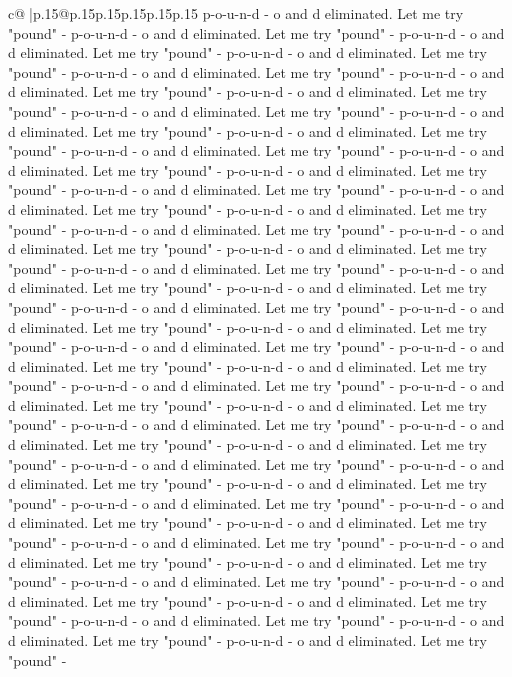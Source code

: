 \documentclass{article}
\begin{document}
{\begin{supertabular}{c@{$\;$}|p{.15\linewidth}@{}p{.15\linewidth}p{.15\linewidth}p{.15\linewidth}p{.15\linewidth}p{.15\linewidth}}
{{{p{-}o{-}u{-}n{-}d {-} o and d eliminated. Let me try "pound" {-} p{-}o{-}u{-}n{-}d {-} o and d eliminated. Let me try "pound" {-} p{-}o{-}u{-}n{-}d {-} o and d eliminated. Let me try "pound" {-} p{-}o{-}u{-}n{-}d {-} o and d eliminated. Let me try "pound" {-} p{-}o{-}u{-}n{-}d {-} o and d eliminated. Let me try "pound" {-} p{-}o{-}u{-}n{-}d {-} o and d eliminated. Let me try "pound" {-} p{-}o{-}u{-}n{-}d {-} o and d eliminated. Let me try "pound" {-} p{-}o{-}u{-}n{-}d {-} o and d eliminated. Let me try "pound" {-} p{-}o{-}u{-}n{-}d {-} o and d eliminated. Let me try "pound" {-} p{-}o{-}u{-}n{-}d {-} o and d eliminated. Let me try "pound" {-} p{-}o{-}u{-}n{-}d {-} o and d eliminated. Let me try "pound" {-} p{-}o{-}u{-}n{-}d {-} o and d eliminated. Let me try "pound" {-} p{-}o{-}u{-}n{-}d {-} o and d eliminated. Let me try "pound" {-} p{-}o{-}u{-}n{-}d {-} o and d eliminated. Let me try "pound" {-} p{-}o{-}u{-}n{-}d {-} o and d eliminated. Let me try "pound" {-} p{-}o{-}u{-}n{-}d {-} o and d eliminated. Let me try "pound" {-} p{-}o{-}u{-}n{-}d {-} o and d eliminated. Let me try "pound" {-} p{-}o{-}u{-}n{-}d {-} o and d eliminated. Let me try "pound" {-} p{-}o{-}u{-}n{-}d {-} o and d eliminated. Let me try "pound" {-} p{-}o{-}u{-}n{-}d {-} o and d eliminated. Let me try "pound" {-} p{-}o{-}u{-}n{-}d {-} o and d eliminated. Let me try "pound" {-} p{-}o{-}u{-}n{-}d {-} o and d eliminated. Let me try "pound" {-} p{-}o{-}u{-}n{-}d {-} o and d eliminated. Let me try "pound" {-} p{-}o{-}u{-}n{-}d {-} o and d eliminated. Let me try "pound" {-} p{-}o{-}u{-}n{-}d {-} o and d eliminated. Let me try "pound" {-} p{-}o{-}u{-}n{-}d {-} o and d eliminated. Let me try "pound" {-} p{-}o{-}u{-}n{-}d {-} o and d eliminated. Let me try "pound" {-} p{-}o{-}u{-}n{-}d {-} o and d eliminated. Let me try "pound" {-} p{-}o{-}u{-}n{-}d {-} o and d eliminated. Let me try "pound" {-} p{-}o{-}u{-}n{-}d {-} o and d eliminated. Let me try "pound" {-} p{-}o{-}u{-}n{-}d {-} o and d eliminated. Let me try "pound" {-} p{-}o{-}u{-}n{-}d {-} o and d eliminated. Let me try "pound" {-} p{-}o{-}u{-}n{-}d {-} o and d eliminated. Let me try "pound" {-} p{-}o{-}u{-}n{-}d {-} o and d eliminated. Let me try "pound" {-} p{-}o{-}u{-}n{-}d {-} o and d eliminated. Let me try "pound" {-} p{-}o{-}u{-}n{-}d {-} o and d eliminated. Let me try "pound" {-} p{-}o{-}u{-}n{-}d {-} o and d eliminated. Let me try "pound" {-} p{-}o{-}u{-}n{-}d {-} o and d eliminated. Let me try "pound" {-} p{-}o{-}u{-}n{-}d {-} o and d eliminated. Let me try "pound" {-} p{-}o{-}u{-}n{-}d {-} o and d eliminated. Let me try "pound" {-} p{-}o{-}u{-}n{-}d {-} o and d eliminated. Let me try "pound" {-} p{-}o{-}u{-}n{-}d {-} o and d eliminated. Let me try "pound" {-} p{-}o{-}u{-}n{-}d {-} o and d eliminated. Let me try "pound" {-} p{-}o{-}u{-}n{-}d {-} o and d eliminated. Let me try "pound" {-} p{-}o{-}u{-}n{-}d {-} o and d eliminated. Let me try "pound" {-} p{-}o{-}u{-}n{-}d {-} o and d eliminated. Let me try "pound" {-} p{-}o{-}u{-}n{-}d {-} o and d eliminated. Let me try "pound" {-} p{-}o{-}u{-}n{-}d {-} o and d eliminated. Let me try "pound" {-} p{-}o{-}u{-}n{-}d {-} o and d eliminated. Let me try "pound" {-} }}}
\end{supertabular}}
\end{document}
